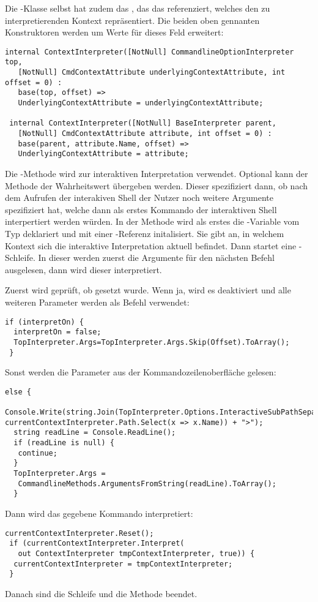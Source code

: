 Die -Klasse selbst hat zudem das , das das  referenziert, welches den zu interpretierenden Kontext repräsentiert.
Die beiden oben gennanten Konstruktoren werden um Werte für dieses Feld erweitert:
\begin{lstlisting}[language={[Sharp]C}]
 internal ContextInterpreter([NotNull] CommandlineOptionInterpreter top,
   [NotNull] CmdContextAttribute underlyingContextAttribute, int offset = 0) :
   base(top, offset) =>
   UnderlyingContextAttribute = underlyingContextAttribute;

 internal ContextInterpreter([NotNull] BaseInterpreter parent,
   [NotNull] CmdContextAttribute attribute, int offset = 0) :
   base(parent, attribute.Name, offset) =>
   UnderlyingContextAttribute = attribute;
\end{lstlisting}
Die -Methode wird zur interaktiven Interpretation verwendet.
Optional kann der Methode der Wahrheitswert  übergeben werden.
Dieser spezifiziert dann, ob nach dem Aufrufen der interakiven Shell der Nutzer noch weitere Argumente spezifiziert hat, welche dann als erstes Kommando der interaktiven Shell interpertiert werden würden.
In der Methode wird als erstes die -Variable vom Typ  deklariert und mit einer -Referenz initalisiert.
Sie gibt an, in welchem Kontext sich die interaktive Interpretation aktuell befindet.
Dann startet eine -Schleife.
In dieser werden zuerst die Argumente für den nächsten Befehl ausgelesen, dann wird dieser interpretiert.

Zuerst wird geprüft, ob  gesetzt wurde.
Wenn ja, wird es deaktiviert und alle weiteren Parameter werden als Befehl verwendet:
\begin{lstlisting}[title=""]
 if (interpretOn) {
  interpretOn = false;
  TopInterpreter.Args=TopInterpreter.Args.Skip(Offset).ToArray();
 }
\end{lstlisting}
Sonst werden die Parameter aus der Kommandozeilenoberfläche gelesen:
\begin{lstlisting}[title=""]
 else {
  Console.Write(string.Join(TopInterpreter.Options.InteractiveSubPathSeparator, currentContextInterpreter.Path.Select(x => x.Name)) + ">");
  string readLine = Console.ReadLine();
  if (readLine is null) {
   continue;
  }
  TopInterpreter.Args =
   CommandlineMethods.ArgumentsFromString(readLine).ToArray();
  } \end{lstlisting}
Dann wird das gegebene Kommando interpretiert:
\begin{lstlisting}[title=""]
 currentContextInterpreter.Reset();
 if (currentContextInterpreter.Interpret(
   out ContextInterpreter tmpContextInterpreter, true)) {
  currentContextInterpreter = tmpContextInterpreter;
 }
\end{lstlisting}
Danach sind die Schleife und die Methode beendet.

